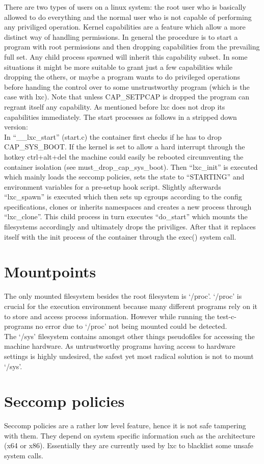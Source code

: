 There are two types of users on a linux system: the root user who is basically allowed to do everything and the normal user 
who is not capable of performing any priviliged operation. Kernel capabilities are a feature which allow a more distinct way of handling
permissions. In general the procedure is to start a program with root permissions and then dropping capabilities from the prevailing full set.
Any child process spawned will inherit this capability subset.
In some situations it might be more suitable to grant just a few capabilities while dropping the others, or maybe a program wants to do
privileged operations before handing the control over to some unstrustworthy program (which is the case with lxc). Note
that unless CAP\_SETPCAP is dropped the program can regrant itself any capability\cite{kernelcaps}.
As mentioned before lxc does not drop its capabilities immediately. The start processes as follows in a stripped down version:\\
In ``\_\_lxc\_start'' (start.c) the container first checks if he has to drop CAP\_SYS\_BOOT. If the kernel is set to allow a hard interrupt through the
hotkey ctrl+alt+del the machine could easily be rebooted circumventing the container isolation (see must\_drop\_cap\_sys\_boot).
Then ``lxc\_init'' is executed which mainly loads the seccomp policies, sets the state to ``STARTING'' and environment variables for
a pre-setup hook script. Slightly afterwards ``lxc\_spawn'' is executed which then sets up cgroups according to the config specifications,
clones or inherits namespaces and creates a new process through ``lxc\_clone''. This child process in turn executes ``do\_start'' which
mounts the filesystems accordingly and ultimately drops the priviliges. After that it replaces itself with the init process of
the container through the exec() system call.

\section{Mountpoints}

The only mounted filesystem besides the root filesystem is `/proc'. `/proc' is crucial for the execution environment because many
different programs rely on it to store and access process information. However while running the test-c-programs no error due
to `/proc' not being mounted could be detected.\\
The `/sys' filesystem contains amongst other things pseudofiles for accessing the machine hardware. As untrustworthy programs
having access to hardware settings is highly undesired, the safest yet most radical solution is not to mount `/sys'.

\section{Seccomp policies}

Seccomp policies are a rather low level feature, hence it is not safe tampering with them. They depend on system specific information such
as the architecture (x64 or x86). Essentially they are currently used by lxc to blacklist some unsafe system calls.